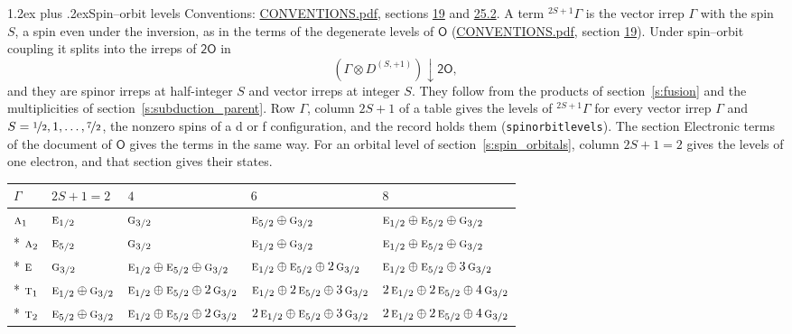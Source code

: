 \documentclass[10pt,a4paper]{article}
\makeatletter
\renewcommand\section{\@startsection{section}{1}{\z@}{-3ex plus -1ex minus -.2ex}%
  {1.2ex plus .2ex}{\normalfont\large\sffamily\bfseries\color{parttitle}}}
\numberwithin{equation}{section}
\newcommand{\grp}[1]{\mathsf{#1}}
\newcommand{\irr}[1]{\text{\normalfont\scshape #1}}
\newcommand{\restr}[2]{#1\!\downarrow#2}
\newcommand{\irrJp}[2]{D^{(#1,#2)}}
\newcommand{\irrprod}{\otimes}
\newcommand{\term}[2]{{}^{#1}#2}
\makeatother
\begin{document}
\section{Spin--orbit levels}\label{s:spin_orbit}
Conventions: \href{../../CONVENTIONS.pdf}{CONVENTIONS.pdf}, sections \href{../../../rotation/CONVENTIONS.pdf\#conv.19}{19} and \href{../../CONVENTIONS.pdf\#conv.25.2}{25.2}.
\leavevmode\label{n:local.spin}\label{n:symbol.term}A term $\term{2S+1}{\Gamma}$ is the vector irrep $\Gamma$ with the spin $S$, a spin even under the inversion, as in the terms of the degenerate levels of \href{../../../rotation/data/pdf/O.pdf}{$\grp{O}$} (\href{../../CONVENTIONS.pdf}{CONVENTIONS.pdf}, section \href{../../../rotation/CONVENTIONS.pdf\#conv.19}{19}). Under spin--orbit coupling it splits into the irreps of $\grp{2O}$ in
\begin{equation}\label{e:spinorbit}\restr{(\Gamma \irrprod \irrJp{S}{+1})}{\grp{2O}},\end{equation}
and they are spinor irreps at half-integer $S$ and vector irreps at integer $S$. They follow from the products of section~\ref{s:fusion} and the multiplicities of section~\ref{s:subduction_parent}. Row $\Gamma$, column $2S + 1$ of a table gives the levels of $\term{2S+1}{\Gamma}$ for every vector irrep $\Gamma$ and $S = \nicefrac{1}{2}, 1, \dots, \nicefrac{7}{2}$, the nonzero spins of a d or f configuration, and the record holds them (\texttt{spinorbitlevels}). The section Electronic terms of the document of \href{../../../rotation/data/pdf/O.pdf}{$\grp{O}$} gives the terms in the same way. For an orbital level of section~\ref{s:spin_orbitals}, column $2S + 1 = 2$ gives the levels of one electron, and that section gives their states.
{\small\setlength{\tabcolsep}{3pt}\begin{longtable}{@{}lllll@{}}\toprule
$\Gamma$ & $2S + 1 = 2$ & $4$ & $6$ & $8$\\\midrule\endhead
\bottomrule\endfoot\endlastfoot
$\irr{a}_{1}$ & $\irr{e}_{1/2}$ & $\irr{g}_{3/2}$ & $\irr{e}_{5/2}\oplus \irr{g}_{3/2}$ & $\irr{e}_{1/2}\oplus \irr{e}_{5/2}\oplus \irr{g}_{3/2}$\\*
$\irr{a}_{2}$ & $\irr{e}_{5/2}$ & $\irr{g}_{3/2}$ & $\irr{e}_{1/2}\oplus \irr{g}_{3/2}$ & $\irr{e}_{1/2}\oplus \irr{e}_{5/2}\oplus \irr{g}_{3/2}$\\*
$\irr{e}$ & $\irr{g}_{3/2}$ & $\irr{e}_{1/2}\oplus \irr{e}_{5/2}\oplus \irr{g}_{3/2}$ & $\irr{e}_{1/2}\oplus \irr{e}_{5/2}\oplus 2\,\irr{g}_{3/2}$ & $\irr{e}_{1/2}\oplus \irr{e}_{5/2}\oplus 3\,\irr{g}_{3/2}$\\*
$\irr{t}_{1}$ & $\irr{e}_{1/2}\oplus \irr{g}_{3/2}$ & $\irr{e}_{1/2}\oplus \irr{e}_{5/2}\oplus 2\,\irr{g}_{3/2}$ & $\irr{e}_{1/2}\oplus 2\,\irr{e}_{5/2}\oplus 3\,\irr{g}_{3/2}$ & $2\,\irr{e}_{1/2}\oplus 2\,\irr{e}_{5/2}\oplus 4\,\irr{g}_{3/2}$\\*
$\irr{t}_{2}$ & $\irr{e}_{5/2}\oplus \irr{g}_{3/2}$ & $\irr{e}_{1/2}\oplus \irr{e}_{5/2}\oplus 2\,\irr{g}_{3/2}$ & $2\,\irr{e}_{1/2}\oplus \irr{e}_{5/2}\oplus 3\,\irr{g}_{3/2}$ & $2\,\irr{e}_{1/2}\oplus 2\,\irr{e}_{5/2}\oplus 4\,\irr{g}_{3/2}$\\
\bottomrule\end{longtable}}
\end{document}
